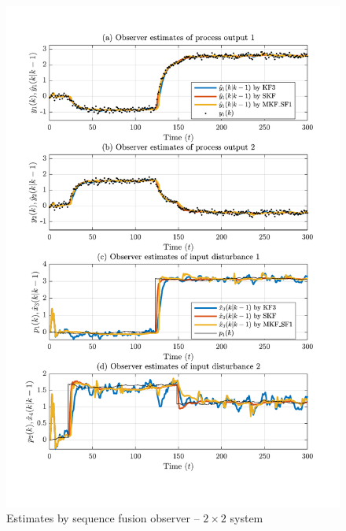 \begin{figure}[htp]
	\centering
	\includegraphics[width=13cm]{images/rod_obs_sim2_all_seed_y_est1_SF1.pdf}
	\caption{Estimates by sequence fusion observer –  $2\times2$ system}
	\label{fig:rod-obs-sim2-yest-1-SF}
\end{figure}

